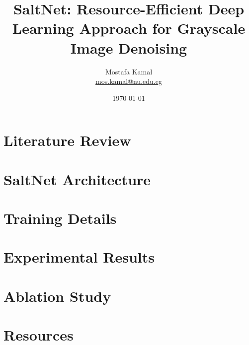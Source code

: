 \documentclass{article}
\begin{document}
\title{SaltNet: Resource-Efficient Deep Learning Approach for Grayscale Image Denoising} %

\author{Mostafa Kamal \\ \href{mailto:mos.kamal@nu.edu.eg}{mos.kamal@nu.edu.eg} }

\date{\today}

\maketitle


\begin{abstract}
    

\end{abstract}

\section{Literature Review}
\label{sec:literature_review}
    
\section{SaltNet Architecture}
\label{sec:saltnet_architecture}
    

\section{Training Details}
\label{sec:training_details}
    

\section{Experimental Results}
\label{sec:experimental_results}
    

\section{Ablation Study}
\label{sec:ablation_study}
    

\pagebreak

\section{Resources}
\label{sec:resources}
\end{document}
